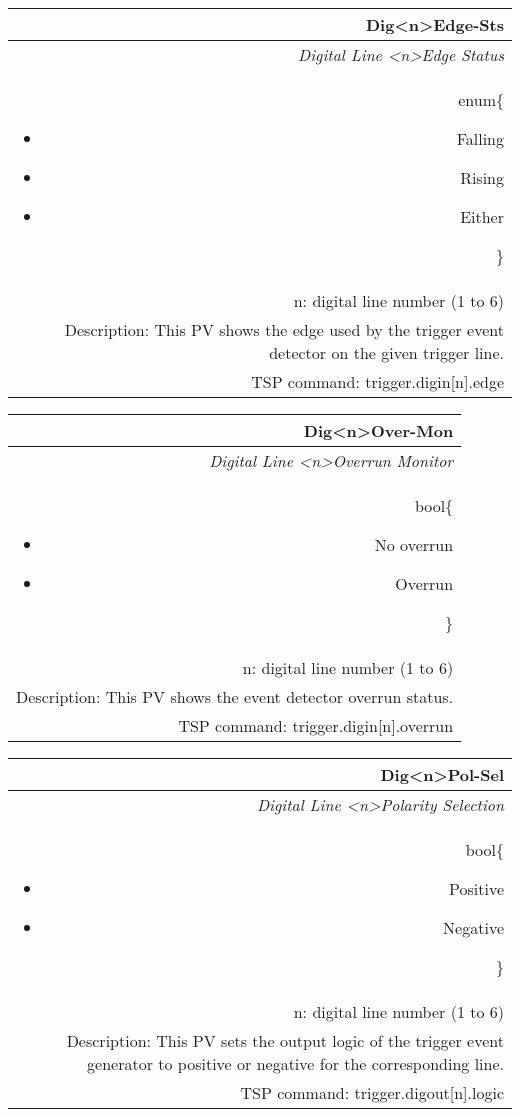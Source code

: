 \documentclass[openany]{article}
\begin{document}
		\begin{tabular}{N}
			\hline
			\bfseries Dig{\textless n\textgreater}Edge-Sts\label{pv:digedge-sts} \\ \hline
			\emph{Digital Line \textless n\textgreater Edge Status} \\
			enum\{\begin{itemize}[noitemsep]
				\small
				\item[] Falling
				\item[] Rising
				\item[] Either
			\end{itemize}\} \\
			n: digital line number (1 to 6) \\
			Description: This PV shows the edge used by the trigger event detector on the given trigger line. \\
			TSP command: trigger.digin[n].edge
		\end{tabular}

		\begin{tabular}{N}
			\hline
			\bfseries Dig{\textless n\textgreater}Over-Mon\label{pv:digover-mon} \\ \hline
			\emph{Digital Line \textless n\textgreater Overrun Monitor} \\
			bool\{\begin{itemize}[noitemsep]
				\small
				\item[] No overrun
				\item[] Overrun
			\end{itemize}\} \\
			n: digital line number (1 to 6) \\
			Description: This PV shows the event detector overrun status. \\
			TSP command: trigger.digin[n].overrun
		\end{tabular}

		\begin{tabular}{N}
			\hline
			\bfseries Dig{\textless n\textgreater}Pol-Sel\label{pv:digpol-sel} \\ \hline
			\emph{Digital Line \textless n\textgreater Polarity Selection} \\
			bool\{\begin{itemize}[noitemsep]
				\small
				\item[] Positive
				\item[] Negative
			\end{itemize}\} \\
			n: digital line number (1 to 6) \\
			Description: This PV sets the output logic of the trigger event generator to positive or negative for the corresponding line. \\
			TSP command: trigger.digout[n].logic
		\end{tabular}
\end{document}
